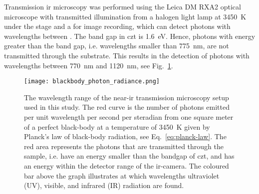 Transmission \ac{ir} microscopy was performed using the Leica DM RXA2 optical microscope with transmitted illumination from a halogen light lamp at \SI{3450}{\kelvin} under the stage and a  for image recording, which can detect photons with wavelengths between . The band gap in \ac{czt} is \SI{1.6}{\electronvolt}. Hence, photons with energy greater than the band gap, i.e. wavelengths smaller than \SI{775}{\nano\metre}, are not transmitted through the substrate. This results in the detection of photons with wavelengths between \SI{770}{\nano\metre} and \SI{1120}{\nano\metre}, see Fig.~\ref{fig:ir-range}.   %

\begin{figure}[htbp]
    \centering
    \texttt{[image: blackbody\_photon\_radiance.png]}
    \caption[Graph showing the wavelength range of the near-\ac{ir} transmission microscopy setup.]{The wavelength range of the near-\ac{ir} transmission microscopy setup used in this study. The red curve is the number of photons emitted per unit wavelength per second per steradian from one square meter of a perfect black-body at a temperature of \SI{3450}{\kelvin} given by Planck's law of black-body radiation, see Eq.~\eqref{eq:planck-law}. The red area represents the photons that are transmitted through the sample, i.e. have an energy smaller than the bandgap of \ac{czt},  and has an energy within the detector range of the \ac{ir}-camera. The coloured bar above the graph illustrates at which wavelengths ultraviolet (UV), visible, and infrared (IR) radiation are found.}
    \label{fig:ir-range}
\end{figure}

